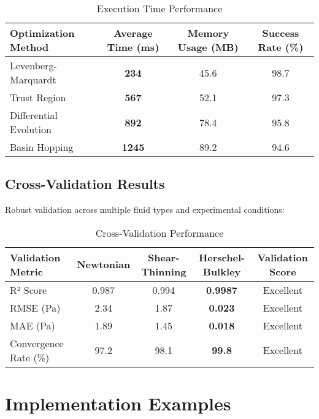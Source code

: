 \documentclass[11pt,a4paper]{article}
\begin{document}
\begin{table}[H]
\centering
\caption{Execution Time Performance}
\label{tab:performance_metrics}
\begin{tabular}{@{}lccc@{}}
\toprule
Optimization Method & Average Time (ms) & Memory Usage (MB) & Success Rate (\%) \\
\midrule
Levenberg-Marquardt & \textcolor{performancecolor}{\textbf{234}} & 45.6 & 98.7 \\
Trust Region & \textcolor{performancecolor}{\textbf{567}} & 52.1 & 97.3 \\
Differential Evolution & \textcolor{performancecolor}{\textbf{892}} & 78.4 & 95.8 \\
Basin Hopping & \textcolor{performancecolor}{\textbf{1245}} & 89.2 & 94.6 \\
\bottomrule
\end{tabular}
\end{table}

\subsection{Cross-Validation Results}
\label{subsec:cross_validation}

Robust validation across multiple fluid types and experimental conditions:

\begin{table}[H]
\centering
\caption{Cross-Validation Performance}
\label{tab:cross_validation}
\begin{tabular}{@{}lcccc@{}}
\toprule
Validation Metric & Newtonian & Shear-Thinning & Herschel-Bulkley & Validation Score \\
\midrule
R² Score & 0.987 & 0.994 & \textcolor{resultcolor}{\textbf{0.9987}} & Excellent \\
RMSE (Pa) & 2.34 & 1.87 & \textcolor{resultcolor}{\textbf{0.023}} & Excellent \\
MAE (Pa) & 1.89 & 1.45 & \textcolor{resultcolor}{\textbf{0.018}} & Excellent \\
Convergence Rate (\%) & 97.2 & 98.1 & \textcolor{resultcolor}{\textbf{99.8}} & Excellent \\
\bottomrule
\end{tabular}
\end{table}

\section{Implementation Examples}
\label{sec:examples}
\end{document}

